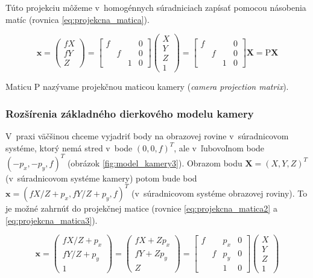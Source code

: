 Túto projekciu môžeme v~homogénnych súradniciach zapísať pomocou násobenia matíc (rovnica \ref{eq:projekcna_matica}).

\begin{equation}
\mathbf{x} 
=
\begin{pmatrix}
fX \\
fY \\
Z
\end{pmatrix}
=
\begin{bmatrix}
f &   &   & 0 \\
  & f &   & 0 \\
  &   & 1 & 0
\end{bmatrix}
\begin{pmatrix}
X \\
Y \\
Z \\
1
\end{pmatrix}
=
\begin{bmatrix}
f &   &   & 0 \\
  & f &   & 0 \\
  &   & 1 & 0
\end{bmatrix}
\mathbf{X}
=
\mathrm{P} \mathbf{X}
\label{eq:projekcna_matica}
\end{equation}

Maticu $\mathrm{P}$ nazývame projekčnou maticou kamery (\emph{camera projection matrix}).

\subsubsection{Rozšírenia základného dierkového modelu kamery}

V~praxi väčšinou chceme vyjadriť body na obrazovej rovine v~súradnicovom systéme, ktorý nemá stred v~bode $(0, 0, f)^T$, ale v~ľubovoľnom bode $(-p_x, -p_y, f)^T$ (obrázok \ref{fig:model_kamery3}). Obrazom bodu $\mathbf{X} = (X, Y, Z)^T$ (v~súradnicovom systéme kamery) potom bude bod $\mathbf{x} = (fX/Z + p_x, fY/Z + p_y, f)^T$ (v~súradnicovom systéme obrazovej roviny). To je možné zahrnúť do projekčnej matice (rovnice \ref{eq:projekcna_matica2} a \ref{eq:projekcna_matica3}).
 
\begin{equation}
\mathbf{x} 
=
\begin{pmatrix}
fX/Z + p_x \\
fY/Z + p_y \\
1
\end{pmatrix}
=
\begin{pmatrix}
fX + Z p_x \\
fY + Z p_y \\
Z
\end{pmatrix}
=
\begin{bmatrix}
f &   &  p_x & 0 \\
  & f &  p_y & 0 \\
  &   &   1  & 0
\end{bmatrix}
\begin{pmatrix}
X \\
Y \\
Z \\
1
\end{pmatrix}
\label{eq:projekcna_matica2}
\end{equation}

